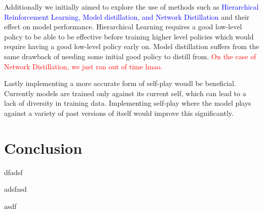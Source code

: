 \documentclass[conference]{IEEEtran}
\begin{document}
Additionally we initially aimed to explore the use of methods such as \textcolor{blue}{Hierarchical Reinforcement Learning, Model distillation, and Network Distillation} and their effect on model performance. Hierarchical Learning requires a good low-level policy to be able to be effective before training higher level policies which would require having a good low-level policy early on. Model distillation suffers from the same drawback of needing some initial good policy to distill from. \textcolor{red}{On the case of Network Distillation, we just ran out of time lmao.}

Lastly implementing a more accurate form of self-play woudl be beneficial. Currently models are trained only against its current self, which can lead to a lack of diversity in training data. Implementing self-play where the model plays against a variety of past versions of itself would improve this significantly.

\section{Conclusion}


\cite{sigal2023improving}

dfadsf \cite{zhang2019hierarchical}

 adsfasd \cite{shao2019survey}


asdf \cite{vinyals2017starcraft}

\cite{Pleines2022RocketSimDRL}

\cite{Misaros2024RocketPPO}

\cite{Albuainain2020RLPhysics}




\end{document}
